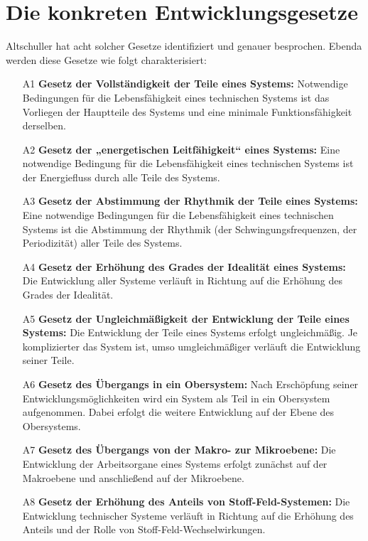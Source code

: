 \documentclass[11pt,a4paper]{article}
\begin{document}
\section{Die konkreten Entwicklungsgesetze}

Altschuller \cite[S. 124\,ff.]{Altschuller1984} hat acht solcher Gesetze
identifiziert und genauer besprochen. Ebenda werden diese Gesetze wie folgt
charakterisiert:
\begin{enumerate}[noitemsep]
\item[A1] \textbf{Gesetz der Vollständigkeit der Teile eines Systems:}
  Notwendige Bedingungen für die Lebensfähigkeit eines technischen Systems ist
  das Vorliegen der Hauptteile des Systems und eine minimale
  Funktionsfähigkeit derselben.
\item[A2] \textbf{Gesetz der „energetischen Leitfähigkeit“ eines Systems:}
  Eine notwendige Bedingung für die Lebensfähigkeit eines technischen Systems
  ist der Energiefluss durch alle Teile des Systems.
\item[A3] \textbf{Gesetz der Abstimmung der Rhythmik der Teile eines Systems:}
  Eine notwendige Bedingungen für die Lebensfähigkeit eines technischen
  Systems ist die Abstimmung der Rhythmik (der Schwingungsfrequenzen, der
  Periodizität) aller Teile des Systems.
\item[A4] \textbf{Gesetz der Erhöhung des Grades der Idealität eines Systems:}
  Die Entwicklung aller Systeme verläuft in Richtung auf die Erhöhung des
  Grades der Idealität.
\item[A5] \textbf{Gesetz der Ungleichmäßigkeit der Entwicklung der Teile eines
  Systems:} Die Entwicklung der Teile eines Systems erfolgt ungleichmäßig. Je
  komplizierter das System ist, umso umgleichmäßiger verläuft die Entwicklung
  seiner Teile.
\item[A6] \textbf{Gesetz des Übergangs in ein Obersystem:} Nach Erschöpfung
  seiner Entwicklungsmöglichkeiten wird ein System als Teil in ein Obersystem
  aufgenommen. Dabei erfolgt die weitere Entwicklung auf der Ebene des
  Obersystems.
\item[A7] \textbf{Gesetz des Übergangs von der Makro- zur Mikroebene:} Die
  Entwicklung der Arbeitsorgane eines Systems erfolgt zunächst auf der
  Makroebene und anschließend auf der Mikroebene.
\item[A8] \textbf{Gesetz der Erhöhung des Anteils von Stoff-Feld-Systemen:}
  Die Entwicklung technischer Systeme verläuft in Richtung auf die Erhöhung
  des Anteils und der Rolle von Stoff-Feld-Wechselwirkungen.
\end{enumerate}
\end{document}
